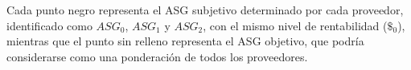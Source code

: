 \documentclass{beamer}
\begin{document}
\begin{frame}

\begin{minipage}{0.45\textwidth}
    Cada punto negro representa el ASG subjetivo determinado por cada proveedor, identificado como $ASG_0$, $ASG_1$ y $ASG_2$, con el mismo nivel de rentabilidad ($\$_0$), mientras que el punto sin relleno representa el ASG objetivo, que podría considerarse como una ponderación de todos los proveedores.
\end{minipage}
\hfill
\begin{minipage}{0.5\textwidth}
    \begin{figure}
        \centering
        \begin{tikzpicture}[x=0.45pt,y=0.45pt,yscale=-1,xscale=1]


\end{tikzpicture}
\end{figure}
\end{minipage}
\end{frame}
\end{document}

